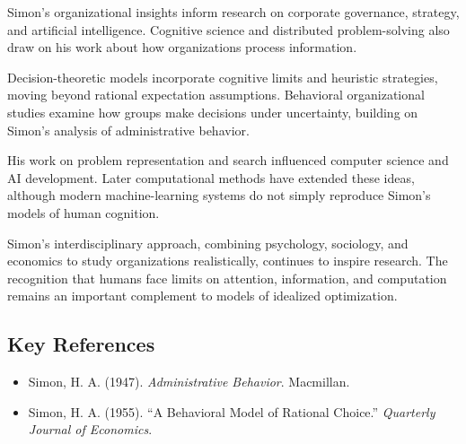 Simon's organizational insights inform research on corporate governance,
strategy, and artificial intelligence. Cognitive science and distributed
problem-solving also draw on his work about how organizations process
information.

Decision-theoretic models incorporate cognitive limits and heuristic
strategies, moving beyond rational expectation assumptions. Behavioral
organizational studies examine how groups make decisions under uncertainty,
building on Simon's analysis of administrative behavior.

His work on problem representation and search influenced computer science and
AI development. Later computational methods have extended these ideas, although
modern machine-learning systems do not simply reproduce Simon's models of human
cognition.

Simon's interdisciplinary approach, combining psychology, sociology, and
economics to study organizations realistically, continues to inspire research.
The recognition that humans face limits on attention, information, and
computation remains an important complement to models of idealized optimization.

\subsection*{Key References}
\begin{itemize}
    \item Simon, H. A. (1947). \textit{Administrative Behavior}. Macmillan.
    \item Simon, H. A. (1955). ``A Behavioral Model of Rational Choice.''
    \textit{Quarterly Journal of Economics}.
\end{itemize}
